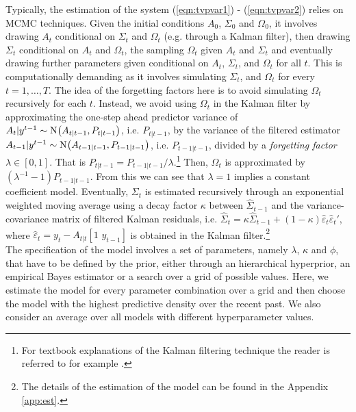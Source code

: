 %
\indent Typically, the estimation of the system (\ref{eqn:tvpvar1}) - (\ref{eqn:tvpvar2}) relies on MCMC techniques. Given the initial conditions $A_0$, $\Sigma_0$ and $\Omega_0$, it involves drawing $A_t$ conditional on $\Sigma_t$ and $\Omega_t$ (e.g. through a Kalman filter), then drawing $\Sigma_t$ conditional on $A_t$ and $\Omega_t$, the sampling $\Omega_t$ given $A_t$ and $\Sigma_t$ and eventually drawing further parameters given conditional on $A_t$, $\Sigma_t$, and $\Omega_t$ for all $t$. This is computationally demanding as it involves simulating $\Sigma_t$, and $\Omega_t$ for every $t=1,\ldots,T$. %
The idea of the forgetting factors here is to avoid simulating $\Omega_t$ recursively for each $t$. Instead, we avoid using $\Omega_t$ in the Kalman filter by approximating the one-step ahead predictor variance of $A_t|y^{t-1}\sim\No{A_{t|t-1},P_{t|t-1}}$, i.e. $P_{t|t-1}$, %
by the variance of the filtered estimator $A_{t-1}|y^{t-1}\sim\No{A_{t-1|t-1},P_{t-1|t-1}}$, i.e. $P_{t-1|t-1}$, divided by a \textit{forgetting factor} $\lambda\in[0,1]$. That is $P_{t|t-1}=P_{t-1|t-1}\big/\lambda$.\footnote{For textbook explanations of the Kalman filtering technique the reader is referred to for example \cite{durbin2012}.} Then, $\Omega_t$ is approximated by $(\lambda^{-1}-1)P_{t-1|t-1}$. From this we can see that $\lambda=1$ implies a constant coefficient model.  Eventually, $\Sigma_t$ is estimated recursively through an exponential weighted moving average using a decay factor $\kappa$ between $\hat{\Sigma}_{t-1}$ and the variance-covariance matrix of filtered Kalman residuals, i.e. $\hat{\Sigma}_t=\kappa\hat{\Sigma}_{t-1}+(1-\kappa)\hat{\varepsilon}_t\hat{\varepsilon}_t'$, where $\hat{\varepsilon}_t=y_t-A_{t|t}[1\,\,y_{t-1}]$ is obtained in the Kalman filter.\footnote{The details of the estimation of the model can be found in the Appendix \ref{app:est}.}\\
%
\indent The specification of the model involves a set of parameters, namely $\lambda$, $\kappa$ and $\phi$, that have to be defined by the prior, either through an hierarchical hyperprior, an empirical Bayes estimator or a search over a grid of possible values. Here, we estimate the model for every parameter combination over a grid and then choose the model with the highest predictive density over the recent past. We also consider an average over all models with different hyperparameter values.\\
